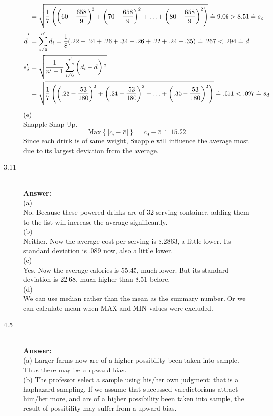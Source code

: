 \documentclass{article}
\begin{document}
\begin{description}
\begin{align}
            &=\sqrt{\frac{1}{7}\left(\left(60-\frac{658}{9}\right)^2+\left(70-\frac{658}{9}\right)^2+\ldots +\left(80-\frac{658}{9}\right)^2\right)}\doteq 9.06>8.51\doteq s_c\\
            \overset{-}{d}'&=\sum _{i\neq 6}^{n'} d_i=\frac{1}{8}(.22+.24+.26+.34+.26+.22+.24+.35)\doteq .267<.294\doteq \overset{-}{d}\\
            s_d'&=\sqrt{\frac{1}{n'-1}\sum _{i\neq 6}^{n'} \left(d_i-\overset{-}{d}\right){}^2} \notag \\
            &=\sqrt{\frac{1}{7}\left(\left(.22-\frac{53}{180}\right)^2+\left(.24-\frac{53}{180}\right)^2+\ldots +\left(.35-\frac{53}{180}\right)^2\right)}\doteq .051<.097\doteq s_d
           \end{align}\newpage
        (e)\\
        Snapple Snap-Up. $$\text{Max}\left\{\left|c_i-\overset{-}{c}\right|\right\}=c_9-\overset{-}{c}\doteq 15.22$$
        Since each drink is of same weight, Snapple will influence the average most due to its largest deviation from the average.\\
    \item[3.11 ]\hfill \\
        {\bf Answer:}\\
        (a)\\
            No. Because these powered drinks are of 32-serving container, adding them to the list will increase the average significantly. \\
        (b)\\
            Neither. Now the average cost per serving is \$.2863, a little lower. Its standard deviation is .089 now, also a little lower.\\
        (c)\\
            Yes. Now the average calories is 55.45, much lower. But its standard deviation is 22.68, much higher than 8.51 before. \\
        (d)\\
            We can use median rather than the mean as the summary number. Or we can calculate mean when MAX and MIN values were excluded.\\
    \item[4.5 ]\hfill \\
        {\bf Answer:}\\
        (a) Larger farms now are of a higher possibility been taken into sample. Thus there may be a upward bias.\\
        (b) The professor select a sample using his/her own judgment: that is a haphazard sampling. If we assume that succussed valedictorians attract him/her more, and are of a higher possibility been taken into sample, the result of possibility may suffer from a upward bias.\\

\end{description}
\end{document}
